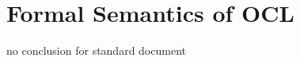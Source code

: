 \documentclass[10pt,DIV12,a4paper,openright,twoside,abstracton]{scrreprt}
\begin{document}
\chapter{Formal Semantics of OCL}

\clearpage
\isatagafp

\endisatagafp
\isatagannexa














%
%
% 
% 


\endisatagannexa
\isatagafp
 no conclusion for standard document 
\endisatagafp



\isatagannexa
  \clearpage {\small \tableofcontents }
\endisatagannexa
\end{document}
